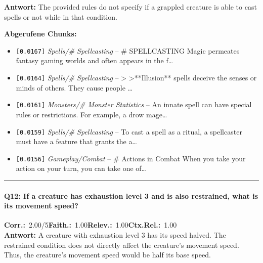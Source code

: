 \noindent\textbf{Antwort:} The provided rules do not specify if a grappled creature is able to cast spells or not while in that condition.

\noindent\textbf{Abgerufene Chunks:}
\begin{itemize}[noitemsep, topsep=2pt]
  \item[\textbf{\#1}] \texttt{[0.0167]} \textit{Spells/# Spellcasting} -- \# SPELLCASTING  Magic permeates fantasy gaming worlds and often appears in the f\ldots
  \item[\textbf{\#2}] \texttt{[0.0164]} \textit{Spells/# Spellcasting} -- > >**Illusion** spells deceive the senses or minds of others. They cause people \ldots
  \item[\textbf{\#3}] \texttt{[0.0161]} \textit{Monsters/# Monster Statistics} -- An innate spell can have special rules or restrictions. For example, a drow mage\ldots
  \item[\textbf{\#4}] \texttt{[0.0159]} \textit{Spells/# Spellcasting} -- To cast a spell as a ritual, a spellcaster must have a feature that grants the a\ldots
  \item[\textbf{\#5}] \texttt{[0.0156]} \textit{Gameplay/Combat} -- \# Actions in Combat  When you take your action on your turn, you can take one of\ldots
\end{itemize}
\vspace{4pt}
\hrule
\vspace{6pt}

\paragraph{Q12: If a creature has exhaustion level 3 and is also restrained, what is its movement speed?}
\noindent \textbf{Corr.:}~2.00/5\quad \textbf{Faith.:}~1.00\quad \textbf{Relev.:}~1.00\quad \textbf{Ctx.Rel.:}~1.00\\

\noindent\textbf{Antwort:} A creature with exhaustion level 3 has its speed halved. The restrained condition does not directly affect the creature's movement speed. Thus, the creature's movement speed would be half its base speed.

